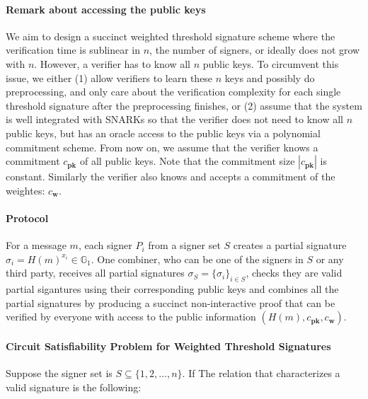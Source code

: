 \paragraph{Remark about accessing the public keys} We aim to design a succinct weighted threshold signature scheme where the verification time is sublinear in $n$, the number of signers, or ideally does not grow with $n$. However, a verifier has to know all $n$ public keys. To circumvent this issue, we either (1) allow verifiers to learn these $n$ keys and possibly do preprocessing, and only care about the verification complexity for each single threshold signature after the preprocessing finishes, or (2) assume that the system is well integrated with SNARKs so that the verifier does not need to know all $n$ public keys, but has an oracle access to the public keys via a polynomial commitment scheme. From now on, we assume that the verifier knows a commitment $c_{\mathbf{pk}}$ of all public keys. Note that the commitment size $|c_{\mathbf{pk}}|$ is constant. Similarly the verifier also knows and accepts a commitment of the weightes: $c_{\mathbf{w}}$. 

\paragraph{Protocol} For a message $m$, each signer $P_i$ from a signer set $S$ creates a partial signature $\sigma_i = H(m)^{x_i}\in \mathbb{G}_1$. One combiner, who can be one of the signers in $S$ or any third party, receives all partial signatures $\sigma_S = \{\sigma_i\}_{i\in S}$, checks they are valid partial sigantures using their corresponding public keys and combines all the partial signatures by producing a succinct non-interactive proof that can be verified by everyone with access to the public information $(H(m), c_{\mathbf{pk}}, c_{\mathbf{w}})$. 

\paragraph{Circuit Satisfiability Problem for Weighted Threshold Signatures} Suppose the signer set is $S\subseteq \{1,2,\dots, n\}$. If  The relation that characterizes a valid signature is the following:


